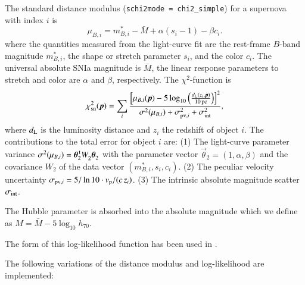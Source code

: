 \documentclass[11pt, chapterprefix, headsepline]{scrartcl}
\begin{document}
The standard distance modulus (\texttt{schi2mode = chi2\_simple}) for a supernova with index $i$ is
%
\begin{equation}
  \mu_{B, i} = m_{B, i}^* - \bar M + \alpha (s_i-1) - \beta c_i.
  \label{mu0_SN}
\end{equation}
%
where the quantities measured from the light-curve fit are the
rest-frame $B$-band magnitude $m_{B, i}^*$, the shape or stretch
parameter $s_i$, and the color $c_i$. The universal absolute SNIa
magnitude is $\bar M$, the linear response parameters to stretch and
color are $\alpha$ and $\beta$, respectively. The $\chi^2$-function is
%
\begin{equation}
  \chi^2_{\rm sn}(\vec p) = \sum_i \frac{\left[
      \mu_{B,i}(\vec p) - 5 \log_{10}\left(\frac{d_{\rm L}(z_i, \vec p)}{10\,{\rm pc}}
      \right)
      \right]^2}{\sigma^2(\mu_{B, i}) +  \sigma_{{\rm pv}, i}^2 +
    \sigma_{\rm int}^2},
  \label{chi2_sn}
\end{equation}
%
where $d_{\rm L}$ is the luminosity distance and $z_i$ the redshift of object $i$.
The contributions to the total error for object $i$ are: (1) The
light-curve parameter variance $\sigma^2(\mu_{B, i}) = \vec \theta_2^{\, \rm
  t} W_2^{} \vec \theta_2^{}$ with the parameter vector $\vec \theta_2
= (1, \alpha, \beta)$ and the covariance $W_2$ of the data vector
$(m_{B,i}^*, s_i, c_i)$. (2) The peculiar velocity uncertainty
$\sigma_{{\rm pv}, i} = 5/\ln 10 \cdot v_{\rm p}/(c \, z_i)$. (3) The
intrinsic absolute magnitude scatter $\sigma_{\rm int}$.

The Hubble parameter is absorbed into the absolute magnitude which we
define as $M = \bar M - 5 \log_{10} h_{70}$.

The form of this log-likelihood function has been used in
\cite{2006A&A...447...31A}.

The following variations of the distance modulus and log-likelihood are
implemented:
\end{document}
